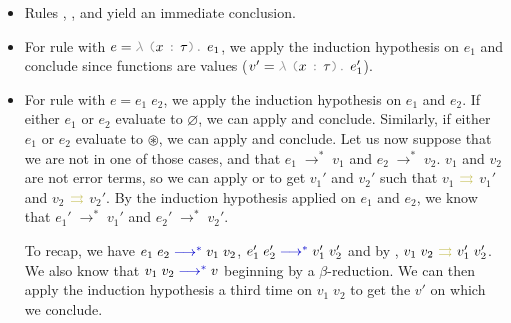 \documentclass[11pt,a4paper]{article}
\newcommand{\synvar}[1]{\ensuremath{#1}}
\newcommand{\synpunct}[1]{\textcolor{black!40!white}{\texttt{#1}}}
\newcommand{\syntyped}{~\synpunct{:}~}
\newcommand{\syndot}{\synpunct{.}~}
\newcommand{\synlambda}{\synpunct{$\lambda$}~}
\newcommand{\synlparen}{\synpunct{(}}
\newcommand{\synrparen}{\synpunct{)}}
\newcommand{\synemptydefault}{\synvar{\varnothing}}
\newcommand{\synerror}{\synvar{\circledast}}
\newcommand{\exctx}[1]{\textcolor{blue!80!black}{\ensuremath{#1}}}
\newcommand{\exevalstar}{\exctx{\;\longrightarrow^*\;}}
\newcommand{\compctx}[1]{\textcolor{yellow!70!black}{\ensuremath{#1}}}
\newcommand{\compiles}{\ensuremath{~\compctx{\rightrightarrows}~}}
\begin{document}
\begin{itemize}
  \item Rules , ,  and 
   yield an immediate conclusion.
  \item For rule  with
   $\synvar{e}=\synlambda\synlparen\synvar{x}\syntyped\synvar{\tau}\synrparen\syndot\synvar{e_1}$,
   we apply the induction hypothesis on \synvar{e_1} and conclude since functions 
   are values ($\synvar{v'}=\synlambda\synlparen\synvar{x}\syntyped\synvar{\tau}\synrparen\syndot\synvar{e_1'}$).
  \item For rule  with $\synvar{e} = \synvar{e_1}\;\synvar{e_2}$, we 
  apply the induction hypothesis on \synvar{e_1} and \synvar{e_2}. If either 
  \synvar{e_1} or \synvar{e_2} evaluate to \synemptydefault, we can apply 
   and conclude. Similarly, if either 
  \synvar{e_1} or \synvar{e_2} evaluate to \synerror, we can apply 
   and conclude. Let us now suppose that we are not 
  in one of those cases, and that \synvar{e_1}\exevalstar\synvar{v_1} and 
  \synvar{e_2}\exevalstar\synvar{v_2}. \synvar{v_1} and \synvar{v_2} are not 
  error terms, so we can apply  or  to 
  get \synvar{v_1'} and \synvar{v_2'} such that \synvar{v_1}\compiles\synvar{v_1'}
  and \synvar{v_2}\compiles\synvar{v_2'}. By the induction hypothesis applied on 
  \synvar{e_1} and \synvar{e_2}, we know that \synvar{e_1'}\exevalstar\synvar{v_1'}
  and \synvar{e_2'}\exevalstar\synvar{v_2'}. 

  To recap, we have $\synvar{e_1}\;\synvar{e_2}\exevalstar\synvar{v_1}\;\synvar{v_2}$,
  $\synvar{e_1'}\;\synvar{e_2'}\exevalstar\synvar{v_1'}\;\synvar{v_2'}$ and 
  by , $\synvar{v_1}\;\synvar{v_2}\compiles\synvar{v_1'}\;\synvar{v_2'}$.
  We also know that $\synvar{v_1}\;\synvar{v_2}\exevalstar\synvar{v}$ beginning 
  by a $\beta$-reduction. We can then apply the induction hypothesis a third time 
  on $\synvar{v_1}\;\synvar{v_2}$ to get the \synvar{v'} on which we conclude.


\end{itemize}
\end{document}
